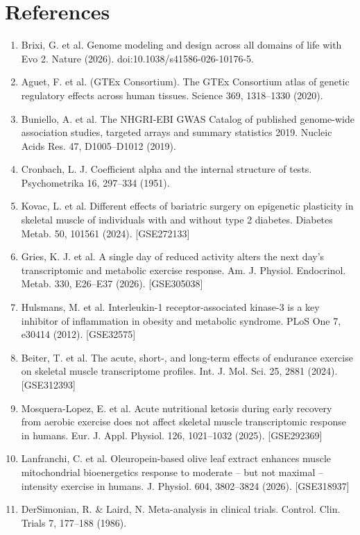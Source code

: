 \documentclass[11pt]{article}
\begin{document}
\section*{References}
\begin{enumerate}\setlength{\itemsep}{1pt}
\item Brixi, G. et al. Genome modeling and design across all domains of life with Evo 2. Nature (2026). doi:10.1038/s41586-026-10176-5.
\item Aguet, F. et al. (GTEx Consortium). The GTEx Consortium atlas of genetic regulatory effects across human tissues. Science 369, 1318–1330 (2020).
\item Buniello, A. et al. The NHGRI-EBI GWAS Catalog of published genome-wide association studies, targeted arrays and summary statistics 2019. Nucleic Acids Res. 47, D1005–D1012 (2019).
\item Cronbach, L. J. Coefficient alpha and the internal structure of tests. Psychometrika 16, 297–334 (1951).
\item Kovac, L. et al. Different effects of bariatric surgery on epigenetic plasticity in skeletal muscle of individuals with and without type 2 diabetes. Diabetes Metab. 50, 101561 (2024). [GSE272133]
\item Gries, K. J. et al. A single day of reduced activity alters the next day's transcriptomic and metabolic exercise response. Am. J. Physiol. Endocrinol. Metab. 330, E26–E37 (2026). [GSE305038]
\item Hulsmans, M. et al. Interleukin-1 receptor-associated kinase-3 is a key inhibitor of inflammation in obesity and metabolic syndrome. PLoS One 7, e30414 (2012). [GSE32575]
\item Beiter, T. et al. The acute, short-, and long-term effects of endurance exercise on skeletal muscle transcriptome profiles. Int. J. Mol. Sci. 25, 2881 (2024). [GSE312393]
\item Mosquera-Lopez, E. et al. Acute nutritional ketosis during early recovery from aerobic exercise does not affect skeletal muscle transcriptomic response in humans. Eur. J. Appl. Physiol. 126, 1021–1032 (2025). [GSE292369]
\item Lanfranchi, C. et al. Oleuropein-based olive leaf extract enhances muscle mitochondrial bioenergetics response to moderate – but not maximal – intensity exercise in humans. J. Physiol. 604, 3802–3824 (2026). [GSE318937]
\item DerSimonian, R. \& Laird, N. Meta-analysis in clinical trials. Control. Clin. Trials 7, 177–188 (1986).

\end{enumerate}
\end{document}

